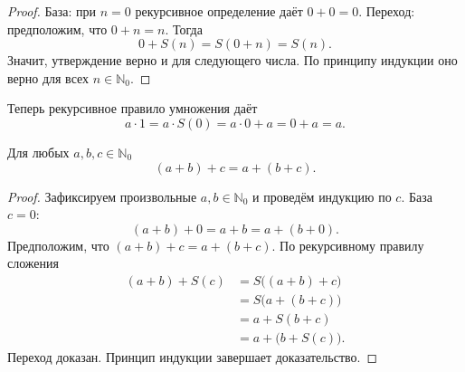 \begin{proof}
База: при \(n=0\) рекурсивное определение даёт \(0+0=0\).
Переход: предположим, что \(0+n=n\). Тогда
\[
0+S(n)=S(0+n)=S(n).
\]
Значит, утверждение верно и для следующего числа. По принципу индукции оно верно для всех \(n\in\mathbb N_0\).
\end{proof}

Теперь рекурсивное правило умножения даёт
\[
a\cdot1=a\cdot S(0)=a\cdot0+a=0+a=a.
\]

\begin{theorem}
Для любых \(a,b,c\in\mathbb N_0\)
\[
(a+b)+c=a+(b+c).
\]
\end{theorem}

\begin{proof}
Зафиксируем произвольные \(a,b\in\mathbb N_0\) и проведём индукцию по \(c\).
База \(c=0\):
\[
(a+b)+0=a+b=a+(b+0).
\]
Предположим, что \((a+b)+c=a+(b+c)\). По рекурсивному правилу сложения
\[
\begin{aligned}
(a+b)+S(c)
&=S\bigl((a+b)+c\bigr)\\
&=S\bigl(a+(b+c)\bigr)\\
&=a+S(b+c)\\
&=a+\bigl(b+S(c)\bigr).
\end{aligned}
\]
Переход доказан. Принцип индукции завершает доказательство.
\end{proof}
